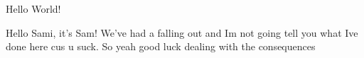 \documentclass[10pt,a4paper]{article}
\begin{document}
Hello World!

Hello Sami, it's Sam! We've had a falling out and Im not going tell you what Ive done here cus u suck. So yeah good luck dealing with the consequences
\end{document}

